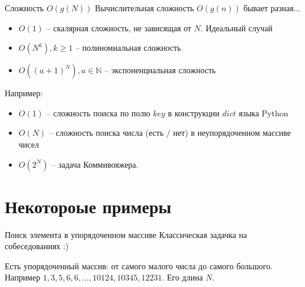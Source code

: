 \begin{frame}{Сложность $O(g(N))$}
	Вычислительная сложность $O(g(n))$ бывает разная...
	
	\begin{itemize}
		\item $O(1)$ -- скалярная сложность, не зависящая от $N$. Идеальный случай
		\item $O(N^k), k \geqslant 1 $ -- полиномиальная сложность
		\item $O((a+1)^N), a \in \mathbb{N}$ -- экспоненциальная сложность
	\end{itemize}
	
	Например:
	\begin{itemize}
		\item $O(1)$ -- сложность поиска по полю $key$ в конструкции $dict$ языка Python
		\item $O(N)$ -- сложность поиска числа (есть / нет) в неупорядоченном массиве чисел
		\item $O(2^N)$ -- задача Коммивояжера.
	\end{itemize}
\end{frame}

\section{Некотороые примеры}\label{section:examples_1}

\begin{frame}{Поиск элемента в упорядоченном массиве}
	Классическая задачка на собеседованиях :)
	
	Есть упорядоченный массив: от самого малого числа до самого большого. 
	Например $1, 3, 5, 6, 6, ..., 10124, 10345, 12231$. 
	Его длина $N$.
	
	
	
\end{frame}


